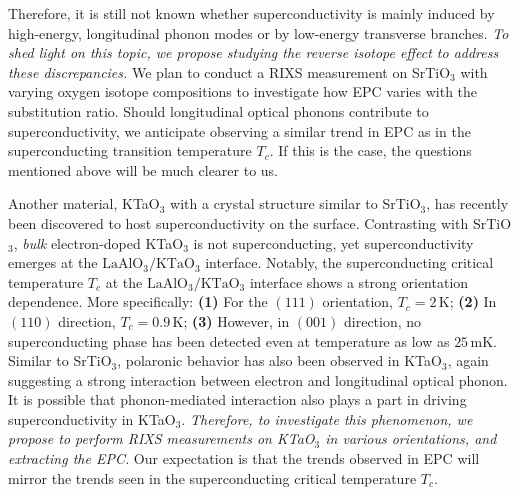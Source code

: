 \documentclass[11pt]{article}
\begin{document}
Therefore, it is still not known whether superconductivity is mainly induced by high-energy, longitudinal phonon modes or by low-energy transverse branches.
\textit{To shed light on this topic, we propose studying the reverse isotope effect to address these discrepancies.} We plan to conduct a RIXS measurement on SrTiO$_{3}$ with varying oxygen isotope compositions to investigate how EPC varies with the substitution ratio.  Should longitudinal optical phonons contribute to superconductivity, we anticipate observing a similar trend in EPC as in the superconducting transition temperature $T_{c}$. If this is the case, the questions mentioned above will be much clearer to us. 

Another material, KTaO$_{3}$ with a crystal structure similar to SrTiO$_{3}$, has recently been discovered to host superconductivity on the surface\cite{ren_two-dimensional_2022}. 
Contrasting with SrTiO$_{3}$, \textit{bulk}  electron-doped KTaO$_{3}$ is not superconducting, yet superconductivity emerges at the $\mathrm{LaAlO_{3}/KTaO_{3}}$ interface\cite{ren_two-dimensional_2022,chen_two-dimensional_2021}. 
Notably, the superconducting critical temperature $T_c$ at the $\mathrm{LaAlO_{3}/KTaO_{3}}$ interface shows a strong orientation dependence\cite{ren_two-dimensional_2022,chen_two-dimensional_2021}. 
More specifically: 
\textbf{(1)} For the $(111)$ orientation, $T_{c} = 2\,\mathrm{K}$\cite{ren_two-dimensional_2022};
\textbf{(2)} In $(110)$ direction, $T_{c} = 0.9\,\mathrm{K}$\cite{chen_two-dimensional_2021};
\textbf{(3)} However, in $(001)$ direction, no superconducting phase has been detected even at temperature as low as $25\,\mathrm{mK}$\cite{ren_two-dimensional_2022}. 
Similar to SrTiO$_{3}$\cite{swartz_polaronic_2018}, polaronic behavior has also been observed in KTaO$_{3}$, again suggesting a strong interaction between electron and longitudinal optical phonon\cite{chen_orientation-dependent_2023}. 
It is possible that phonon-mediated interaction also plays a part in driving superconductivity in KTaO$_{3}$. 
\textit{Therefore, to investigate this phenomenon, we propose to perform RIXS measurements on KTaO$_{3}$ in various orientations, and extracting the EPC.}
Our expectation is that the trends observed in EPC will mirror the trends seen in the superconducting critical temperature $T_c$. 
\end{document}
